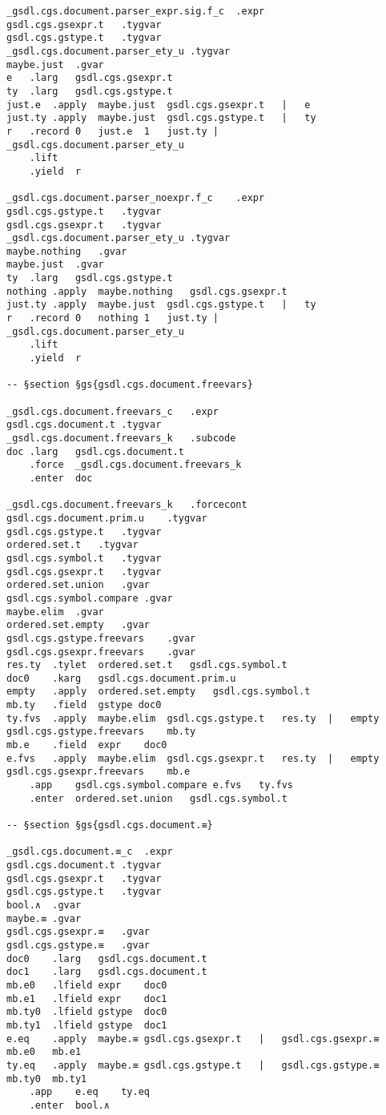 \documentclass{report}
\begin{document}
\begin{verbatim}
_gsdl.cgs.document.parser_expr.sig.f_c	.expr
gsdl.cgs.gsexpr.t	.tygvar
gsdl.cgs.gstype.t	.tygvar
_gsdl.cgs.document.parser_ety_u	.tygvar
maybe.just	.gvar
e	.larg	gsdl.cgs.gsexpr.t
ty	.larg	gsdl.cgs.gstype.t
just.e	.apply	maybe.just	gsdl.cgs.gsexpr.t	|	e
just.ty	.apply	maybe.just	gsdl.cgs.gstype.t	|	ty
r	.record	0	just.e	1	just.ty	|	_gsdl.cgs.document.parser_ety_u
	.lift
	.yield	r

_gsdl.cgs.document.parser_noexpr.f_c	.expr
gsdl.cgs.gstype.t	.tygvar
gsdl.cgs.gsexpr.t	.tygvar
_gsdl.cgs.document.parser_ety_u	.tygvar
maybe.nothing	.gvar
maybe.just	.gvar
ty	.larg	gsdl.cgs.gstype.t
nothing	.apply	maybe.nothing	gsdl.cgs.gsexpr.t
just.ty	.apply	maybe.just	gsdl.cgs.gstype.t	|	ty
r	.record	0	nothing	1	just.ty	|	_gsdl.cgs.document.parser_ety_u
	.lift
	.yield	r

-- §section §gs{gsdl.cgs.document.freevars}

_gsdl.cgs.document.freevars_c	.expr
gsdl.cgs.document.t	.tygvar
_gsdl.cgs.document.freevars_k	.subcode
doc	.larg	gsdl.cgs.document.t
	.force	_gsdl.cgs.document.freevars_k
	.enter	doc

_gsdl.cgs.document.freevars_k	.forcecont
gsdl.cgs.document.prim.u	.tygvar
gsdl.cgs.gstype.t	.tygvar
ordered.set.t	.tygvar
gsdl.cgs.symbol.t	.tygvar
gsdl.cgs.gsexpr.t	.tygvar
ordered.set.union	.gvar
gsdl.cgs.symbol.compare	.gvar
maybe.elim	.gvar
ordered.set.empty	.gvar
gsdl.cgs.gstype.freevars	.gvar
gsdl.cgs.gsexpr.freevars	.gvar
res.ty	.tylet	ordered.set.t	gsdl.cgs.symbol.t
doc0	.karg	gsdl.cgs.document.prim.u
empty	.apply	ordered.set.empty	gsdl.cgs.symbol.t
mb.ty	.field	gstype doc0
ty.fvs	.apply	maybe.elim	gsdl.cgs.gstype.t	res.ty	|	empty	gsdl.cgs.gstype.freevars	mb.ty
mb.e	.field	expr	doc0
e.fvs	.apply	maybe.elim	gsdl.cgs.gsexpr.t	res.ty	|	empty	gsdl.cgs.gsexpr.freevars	mb.e
	.app	gsdl.cgs.symbol.compare	e.fvs	ty.fvs
	.enter	ordered.set.union	gsdl.cgs.symbol.t

-- §section §gs{gsdl.cgs.document.≡}

_gsdl.cgs.document.≡_c	.expr
gsdl.cgs.document.t	.tygvar
gsdl.cgs.gsexpr.t	.tygvar
gsdl.cgs.gstype.t	.tygvar
bool.∧	.gvar
maybe.≡	.gvar
gsdl.cgs.gsexpr.≡	.gvar
gsdl.cgs.gstype.≡	.gvar
doc0	.larg	gsdl.cgs.document.t
doc1	.larg	gsdl.cgs.document.t
mb.e0	.lfield	expr	doc0
mb.e1	.lfield	expr	doc1
mb.ty0	.lfield	gstype	doc0
mb.ty1	.lfield	gstype	doc1
e.eq	.apply	maybe.≡	gsdl.cgs.gsexpr.t	|	gsdl.cgs.gsexpr.≡	mb.e0	mb.e1
ty.eq	.apply	maybe.≡	gsdl.cgs.gstype.t	|	gsdl.cgs.gstype.≡	mb.ty0	mb.ty1
	.app	e.eq	ty.eq
	.enter	bool.∧


\end{verbatim}
\end{document}
